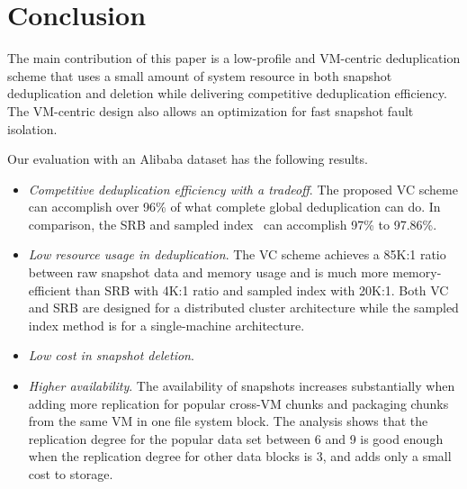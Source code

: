 \section{Conclusion}
\label{sect:conclusion}
The main contribution of this paper is a low-profile and VM-centric deduplication scheme that
uses  a small amount of system resource in both snapshot deduplication and deletion
while delivering competitive deduplication efficiency.
The VM-centric design also allows an optimization for  fast snapshot fault isolation.
 
Our evaluation with an Alibaba dataset has the following results.
\begin{itemize}
\item {\em Competitive deduplication efficiency with a tradeoff}. 
The proposed VC scheme 
can accomplish over  96\% of what complete global
deduplication can do. In comparison, the SRB and sampled index~\cite{Dong2011,extreme_binning09,Guo2011}
can accomplish 97\% to 97.86\%.
\item {\em Low resource usage in deduplication}. 
The VC scheme achieves a 85K:1 ratio between raw snapshot data and memory usage
and is much more memory-efficient than 
SRB  with 4K:1 ratio and sampled index with 20K:1.
Both VC and SRB are designed for a distributed cluster architecture while
the sampled index method is for a single-machine architecture.
\item {\em Low cost in snapshot deletion}. 
\item {\em Higher availability}. 
The availability of snapshots increases substantially when
adding more replication for popular cross-VM chunks and packaging chunks from the same 
VM in one file system block. The analysis shows that the replication degree
for the popular data set between 6 and 9 is good enough when the replication degree
for other data blocks is 3, and adds only a small cost to storage.
\end{itemize}


